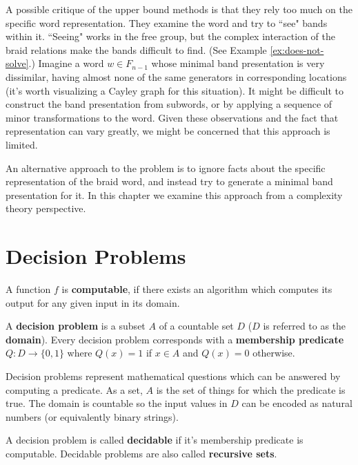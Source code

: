 \documentclass[12pt]{thesis}
\begin{document}
\label{chap:complexity}

A possible critique of the upper bound methods is that they rely too much on
the specific word representation.
They examine the word and try to ``see" bands within it.
``Seeing" works in the free group,
but the complex interaction of the braid relations make the bands
difficult to find. (See Example \ref{ex:does-not-solve}.)
Imagine a word $w \in F_{n-1}$ whose minimal band presentation
is very dissimilar, having almost none of the same generators
in corresponding locations (it's worth visualizing a Cayley graph for this situation).
It might be difficult to construct the band presentation
from subwords, or by applying a sequence of minor transformations to the word.
Given these observations and the fact that representation can vary greatly,
we might be concerned that this approach is limited. 

An alternative approach to the problem is to ignore facts about the specific representation
of the braid word, and instead try to generate a minimal band presentation for it.
In this chapter we examine this approach from a complexity theory perspective.

\section{Decision Problems}

\begin{definition}
    A function $f$ is \textbf{computable}, if there exists an algorithm 
    which computes its output for any given input in its domain.
\end{definition}

\begin{definition}
    A \textbf{decision problem} is a subset $A$ of a countable set $D$ ($D$ is referred to as the \textbf{domain}).
    Every decision problem corresponds with a \textbf{membership predicate}
    $Q \colon D \rightarrow \{ 0, 1 \}$
    where $Q(x) = 1$ if $x \in A$ and $Q(x) = 0$ otherwise.
\end{definition}

Decision problems represent mathematical questions which 
can be answered by computing a predicate.
As a set, $A$ is the set of things for which the predicate is true.
The domain is countable so the input values in $D$ can be encoded as natural numbers
(or equivalently binary strings).

\begin{definition}
    A decision problem is called \textbf{decidable} if it's
    membership predicate is computable.
    Decidable problems are also called \textbf{recursive sets}.
\end{definition}
\end{document}
